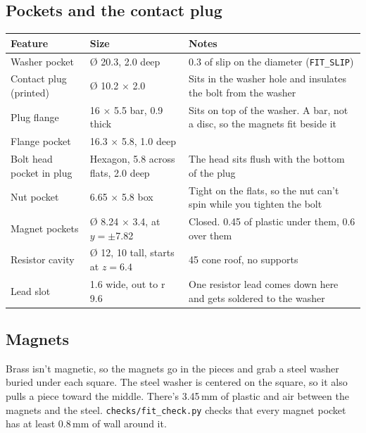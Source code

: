 \documentclass[10pt]{article}
\newcommand{\mm}{\,mm}
\newcommand{\file}[1]{\texttt{#1}}
\begin{document}
\subsection{Pockets and the contact plug}

\begin{tabularx}{\textwidth}{l l L}
\toprule
Feature & Size & Notes \\
\midrule
Washer pocket & \O{} 20.3, 2.0 deep & 0.3 of slip on the diameter (\texttt{FIT\_SLIP}) \\
Contact plug (printed) & \O{} 10.2 $\times$ 2.0 & Sits in the washer hole and insulates the bolt from the washer \\
Plug flange & 16 $\times$ 5.5 bar, 0.9 thick & Sits on top of the washer. A bar, not a disc, so the magnets fit beside it \\
Flange pocket & 16.3 $\times$ 5.8, 1.0 deep & \\
Bolt head pocket in plug & Hexagon, 5.8 across flats, 2.0 deep & The head sits flush with the bottom of the plug \\
Nut pocket & 6.65 $\times$ 5.8 box & Tight on the flats, so the nut can't spin while you tighten the bolt \\
Magnet pockets & \O{} 8.24 $\times$ 3.4, at $y = \pm$7.82 & Closed. 0.45 of plastic under them, 0.6 over them \\
Resistor cavity & \O{} 12, 10 tall, starts at $z = 6.4$ & 45\textdegree{} cone roof, no supports \\
Lead slot & 1.6 wide, out to r 9.6 & One resistor lead comes down here and gets soldered to the washer \\
\bottomrule
\end{tabularx}

\subsection{Magnets}

Brass isn't magnetic, so the magnets go in the pieces and grab a steel washer buried under each
square. The steel washer is centered on the square, so it also pulls a piece toward the middle.
There's 3.45\mm{} of plastic and air between the magnets and the steel. \file{checks/fit\_check.py}
checks that every magnet pocket has at least 0.8\mm{} of wall around it.
\end{document}
